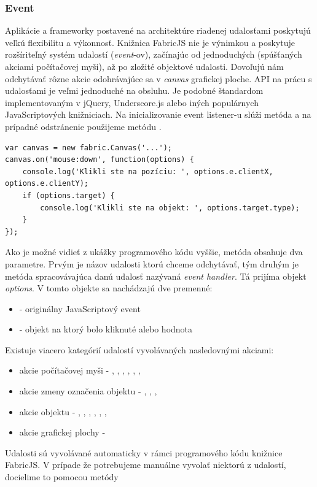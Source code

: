 \subsubsection{Event}

Aplikácie a frameworky postavené na architektúre riadenej udalosťami poskytujú veľkú flexibilitu a výkonnosť. Knižnica FabricJS nie je výnimkou a poskytuje rozšíriteľný systém udalostí (\textit{event}-ov), začínajúc od jednoduchých (spúšťaných akciami počítačovej myši), až po zložité objektové udalosti. Dovoľujú nám odchytávať rôzne akcie odohrávajúce sa v \textit{canvas} grafickej ploche. API na prácu s udalosťami je veľmi jednoduché na obsluhu. Je podobné štandardom implementovaným v jQuery, Underscore.js alebo iných populárnych JavaScriptových knižniciach. Na inicializovanie event listener-u slúži metóda  a na prípadné odstránenie použijeme metódu .
\begin{lstlisting}[style=web,caption={Ukážka programovej implementácie na prácu s eventami},captionpos=b, label={lst:fabric-events}]
var canvas = new fabric.Canvas('...');
canvas.on('mouse:down', function(options) {
	console.log('Klikli ste na pozíciu: ', options.e.clientX, options.e.clientY);
	if (options.target) {
		console.log('Klikli ste na objekt: ', options.target.type);
	}
});
\end{lstlisting}
Ako je možné vidieť z ukážky programového kódu vyššie, metóda  obsahuje dva parametre. Prvým je názov udalosti ktorú chceme odchytávať, tým druhým je metóda spracovávajúca danú udalosť nazývaná \textit{event handler}. Tá prijíma objekt \textit{options}. V tomto objekte sa nachádzajú dve premenné:
\begin{itemize}
	\item {} - originálny JavaScriptový event
	\item {} - objekt na ktorý bolo kliknuté alebo hodnota 
\end{itemize}
Existuje viacero kategórií udalostí vyvolávaných nasledovnými akciami:
\begin{itemize}
	\item akcie počítačovej myši - , , , , , , 
	\item akcie zmeny označenia objektu - , , , 
	\item akcie objektu - , , , , , , 
	\item akcie grafickej plochy - 
\end{itemize}
Udalosti sú vyvolávané automaticky v rámci programového kódu knižnice FabricJS. V prípade že potrebujeme manuálne vyvolať niektorú z udalostí, docielime to pomocou metódy  

